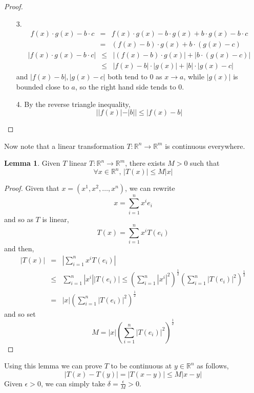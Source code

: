 \documentclass[a4paper,14pt]{extarticle}
\theoremstyle{definition}
\newtheorem*{lemma}{Lemma}
\begin{document}
\begin{proof} \hfill
	\begin{enumerate}
		\item[3.] \begin{eqnarray*}
				f(x)\cdot g(x)-b\cdot c&=&f(x)\cdot g(x)-b\cdot g(x) + b\cdot g(x)-b\cdot c \\
					&=&(f(x)-b)\cdot g(x) + b\cdot(g(x)-c)
			\end{eqnarray*}
			\begin{eqnarray*}
				|f(x)\cdot g(x)-b\cdot c|&\leq&|(f(x)-b)\cdot g(x)|+|b\cdot(g(x)-c)| \\
				&\leq&|f(x)-b|\cdot|g(x)|+|b|\cdot|g(x)-c|
			\end{eqnarray*}
			and $|f(x)-b|, |g(x)-c|$ both tend to 0 as $x\to a$, while $|g(x)|$ is bounded close to $a$, so the right hand side tends to 0.
		\item[4.] By the reverse triangle inequality, \[||f(x)|-|b||\leq|f(x)-b|\]
	\end{enumerate}
\end{proof}

Now note that a linear transformation $T:\mathbb{R}^n\rightarrow\mathbb{R}^m$ is continuous everywhere.

\begin{lemma}
	Given $T$ linear $T:\mathbb{R}^n\rightarrow\mathbb{R}^m$, there exists $M>0$ such that \[\forall x\in\mathbb{R}^n, \,|T(x)|\leq M|x|\]
\end{lemma}

\begin{proof}
	Given that $x=(x^1,x^2,\ldots,x^n)$, we can rewrite \[x=\sum_{i=1}^n x^i e_i\] and so as $T$ is linear, \[T(x)=\sum_{i=1}^n x^i T(e_i)\]
	and then, 
	\begin{eqnarray*}
		|T(x)|&=&|\sum_{i=1}^n x^i T(e_i)| \\
			&\leq&\sum_{i=1}^n|x^i||T(e_i)|\leq(\sum_{i=1}^n|x^i|^2)^\frac{1}{2}(\sum_{i=1}^n|T(e_i)|^2)^\frac{1}{2} \\
			&=&|x|(\sum_{i=1}^n|T(e_i)|^2)^\frac{1}{2}
	\end{eqnarray*}
	and so set \[M=|x|(\sum_{i=1}^n|T(e_i)|^2)^\frac{1}{2}\]
\end{proof}

Using this lemma we can prove $T$ to be continuous at $y\in\mathbb{R}^n$ as follows,
\[|T(x)-T(y)|=|T(x-y)|\leq M|x-y|\] Given $\epsilon>0$, we can simply take $\delta=\frac{\epsilon}{M}>0$.
\end{document}
